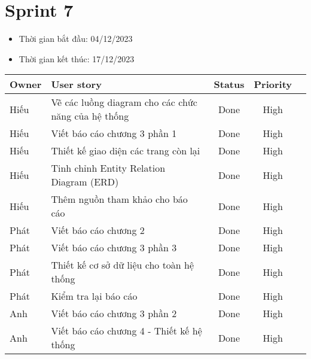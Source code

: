 \section{Sprint 7}
\begin{itemize}
    \item Thời gian bắt đầu: 04/12/2023
    \item Thời gian kết thúc: 17/12/2023
\end{itemize}
\begin{table}[H]
    \begin{tabular}{|m{2.5cm}|m{9cm}|c|c|c|}
    \hline
    \textbf{Owner}  & \textbf{User story}                                & \textbf{Status}  & \textbf{Priority} \\ \hline
    Hiếu               & Vẽ các luồng diagram cho các chức năng của hệ thống                     & Done                              & High         \\ \hline
    Hiếu              & Viết báo cáo chương 3 phần 1                     & Done                              & High         \\ \hline
    Hiếu                & Thiết kế giao diện các trang còn lại                    & Done                              & High         \\ \hline
    Hiếu               & Tinh chỉnh Entity Relation Diagram (ERD)                     & Done                              & High         \\ \hline
    Hiếu               & Thêm nguồn tham khảo cho báo cáo                     & Done                              & High         \\ \hline
    Phát                & Viết báo cáo chương 2                    & Done                              & High         \\ \hline
    Phát               & Viết báo cáo  chương 3 phần 3                    & Done                              & High         \\ \hline
    Phát               & Thiết kế cơ sở dữ liệu cho toàn hệ thống                     & Done                              & High         \\ \hline
    Phát                &Kiểm tra lại báo cáo                    & Done                              & High         \\ \hline
    Anh               & Viết báo cáo chương 3 phần 2                     & Done                              & High         \\ \hline
    Anh               & Viết báo cáo chương 4 - Thiết kế hệ thống                    & Done                              & High         \\ \hline

\end{tabular}
\end{table}
